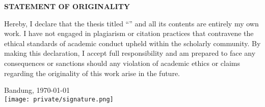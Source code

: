 \newpage
{}
\begin{center}
 \textbf{\large STATEMENT OF ORIGINALITY}\\[3em]
\end{center}
\noindent Hereby, I declare that the thesis titled  
\enquote{\judulcapitalized} and all its contents are entirely my own work. I have not engaged in plagiarism or citation practices that contravene the ethical standards of academic conduct upheld within the scholarly community. By making this declaration, I accept full responsibility and am prepared to face any consequences or sanctions should any violation of academic ethics or claims regarding the originality of this work arise in the future.

\begin{flushright}
Bandung, \today{}\\
\texttt{[image: private/signature.png]}\\[-1cm]
\penulis{}\\
\nim{}
\end{flushright}
